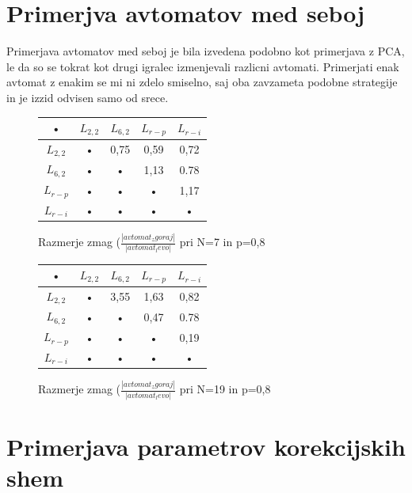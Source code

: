 \documentclass[10pt,a4paper]{report}
\begin{document}
\section{Primerjva avtomatov med seboj}

Primerjava avtomatov med seboj je bila izvedena podobno kot primerjava z PCA, le da so se tokrat kot drugi igralec izmenjevali razlicni avtomati. Primerjati enak avtomat z enakim se mi ni zdelo smiselno, saj oba zavzameta podobne strategije in je izzid odvisen samo od srece.

\begin{figure}[h!]
\begin{center}
\begin{tabular}{|c|c|c|c|c|}
\hline • & $L_{2,2}$ & $L_{6,2}$ & $L_{r-p}$ & $L_{r-i}$ \\ 
\hline $L_{2,2}$ & • & 0,75 & 0,59 & 0,72 \\ 
\hline $L_{6,2}$ & • & • & 1,13 & 0.78 \\ 
\hline $L_{r-p}$ & • & • & • & 1,17 \\ 
\hline $L_{r-i}$ & • & • & • & • \\ 
\hline 
\end{tabular} 
\end{center}
\caption{Razmerje zmag ($\frac{|avtomat_zgoraj|}{|avtomat_levo|}$ pri N=7 in p=0,8}
\end{figure}

\begin{figure}[h!]
\begin{center}
\begin{tabular}{|c|c|c|c|c|}
\hline • & $L_{2,2}$ & $L_{6,2}$ & $L_{r-p}$ & $L_{r-i}$ \\ 
\hline $L_{2,2}$ & • & 3,55 & 1,63 & 0,82 \\ 
\hline $L_{6,2}$ & • & • & 0,47 & 0.78 \\ 
\hline $L_{r-p}$ & • & • & • & 0,19 \\ 
\hline $L_{r-i}$ & • & • & • & • \\ 
\hline 
\end{tabular} 
\end{center}
\caption{Razmerje zmag ($\frac{|avtomat_zgoraj|}{|avtomat_levo|}$ pri N=19 in p=0,8}
\end{figure}

\section{Primerjava parametrov korekcijskih shem}
\end{document}
